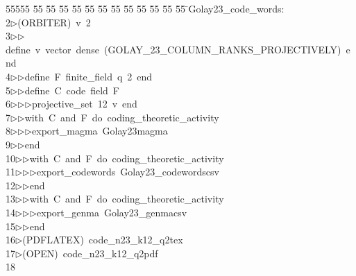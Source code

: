 %
%
\begin{tabbing}
55555 \= 55 \= 55 \= 55 \= 55 \= 55 \= 55 \= 55 \= 55 \= 55 \= 55 \= 55 \= 55 \= \>Golay23\_code\_words:\\[0pt]
2\>$\triangleright$\>(ORBITER)\ v\ 2\ \\[0pt]
3\>$\triangleright$\>$\triangleright$\>define\ v\ vector\ dense\ (GOLAY\_23\_COLUMN\_RANKS\_PROJECTIVELY)\ end\ \\[0pt]
4\>$\triangleright$\>$\triangleright$\>define\ F\ finite\_field\ q\ 2\ end\ \\[0pt]
5\>$\triangleright$\>$\triangleright$\>define\ C\ code\ field\ F\ \\[0pt]
6\>$\triangleright$\>$\triangleright$\>$\triangleright$\>projective\_set\ 12\ v\ end\ \\[0pt]
7\>$\triangleright$\>$\triangleright$\>with\ C\ and\ F\ do\ coding\_theoretic\_activity\ \\[0pt]
8\>$\triangleright$\>$\triangleright$\>$\triangleright$\>export\_magma\ Golay23magma\ \\[0pt]
9\>$\triangleright$\>$\triangleright$\>end\ \\[0pt]
10\>$\triangleright$\>$\triangleright$\>with\ C\ and\ F\ do\ coding\_theoretic\_activity\ \\[0pt]
11\>$\triangleright$\>$\triangleright$\>$\triangleright$\>export\_codewords\ Golay23\_codewordscsv\ \\[0pt]
12\>$\triangleright$\>$\triangleright$\>end\ \\[0pt]
13\>$\triangleright$\>$\triangleright$\>with\ C\ and\ F\ do\ coding\_theoretic\_activity\ \\[0pt]
14\>$\triangleright$\>$\triangleright$\>$\triangleright$\>export\_genma\ Golay23\_genmacsv\ \\[0pt]
15\>$\triangleright$\>$\triangleright$\>end\ \\[0pt]
16\>$\triangleright$\>(PDFLATEX)\ code\_n23\_k12\_q2tex\\[0pt]
17\>$\triangleright$\>(OPEN)\ code\_n23\_k12\_q2pdf\\[0pt]
18\>\end{tabbing}
